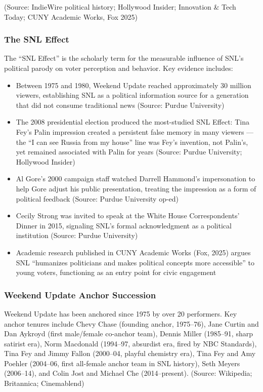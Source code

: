 \documentclass[11pt,letterpaper]{article}
\begin{document}
(Source: IndieWire political history; Hollywood Insider; Innovation \& Tech Today; CUNY Academic Works, Fox 2025)

\subsubsection{The SNL Effect}

The ``SNL Effect'' is the scholarly term for the measurable influence of SNL's political parody on voter perception and behavior. Key evidence includes:

\begin{itemize}
  \item Between 1975 and 1980, Weekend Update reached approximately 30 million viewers, establishing SNL as a political information source for a generation that did not consume traditional news (Source: Purdue University)
  \item The 2008 presidential election produced the most-studied SNL Effect: Tina Fey's Palin impression created a persistent false memory in many viewers --- the ``I can see Russia from my house'' line was Fey's invention, not Palin's, yet remained associated with Palin for years (Source: Purdue University; Hollywood Insider)
  \item Al Gore's 2000 campaign staff watched Darrell Hammond's impersonation to help Gore adjust his public presentation, treating the impression as a form of political feedback (Source: Purdue University op-ed)
  \item Cecily Strong was invited to speak at the White House Correspondents' Dinner in 2015, signaling SNL's formal acknowledgment as a political institution (Source: Purdue University)
  \item Academic research published in CUNY Academic Works (Fox, 2025) argues SNL ``humanizes politicians and makes political concepts more accessible'' to young voters, functioning as an entry point for civic engagement
\end{itemize}

\subsubsection{Weekend Update Anchor Succession}

Weekend Update has been anchored since 1975 by over 20 performers. Key anchor tenures include Chevy Chase (founding anchor, 1975--76), Jane Curtin and Dan Aykroyd (first male/female co-anchor team), Dennis Miller (1985--91, sharp satirist era), Norm Macdonald (1994--97, absurdist era, fired by NBC Standards), Tina Fey and Jimmy Fallon (2000--04, playful chemistry era), Tina Fey and Amy Poehler (2004--06, first all-female anchor team in SNL history), Seth Meyers (2006--14), and Colin Jost and Michael Che (2014--present). (Source: Wikipedia; Britannica; Cinemablend)
\end{document}
